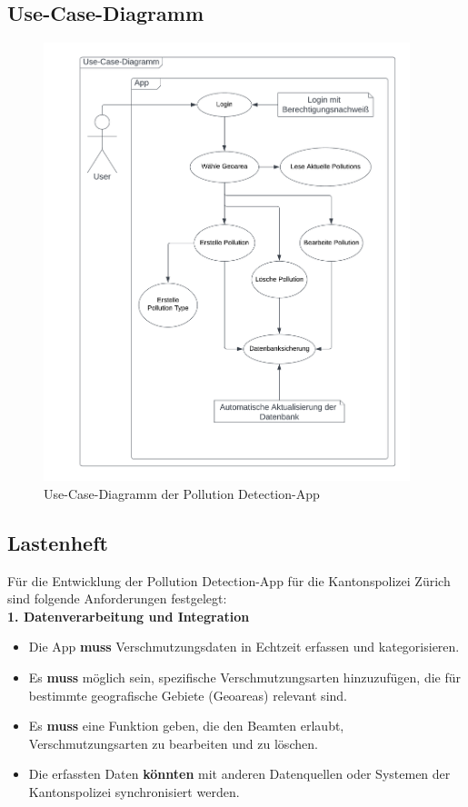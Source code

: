 \documentclass[a4paper,12pt]{article}
\begin{document}
\clearpage
\subsection{Use-Case-Diagramm}
\label{sec:use-case-diagramm}

\begin{figure}[h]
\centering
\includegraphics[width=0.95\textwidth]{bilder/use-case-diagramm.drawio.png}
\caption{Use-Case-Diagramm der \glqq Pollution Detection\grqq{}-App}
\end{figure}

\clearpage
\subsection{Lastenheft}
\label{sec:lastenheft}

Für die Entwicklung der \glqq Pollution Detection\grqq{}-App für die Kantonspolizei Zürich sind folgende Anforderungen festgelegt:\\

\noindent\textbf{1. Datenverarbeitung und Integration}

\begin{itemize}
    \item Die App \textbf{muss} Verschmutzungsdaten in Echtzeit erfassen und kategorisieren.
    \item Es \textbf{muss} möglich sein, spezifische Verschmutzungsarten hinzuzufügen, die für bestimmte geografische Gebiete (Geoareas) relevant sind.
    \item Es \textbf{muss} eine Funktion geben, die den Beamten erlaubt, Verschmutzungsarten zu bearbeiten und zu löschen.
    \item Die erfassten Daten \textbf{könnten} mit anderen Datenquellen oder Systemen der Kantonspolizei synchronisiert werden.
\end{itemize}
\end{document}
